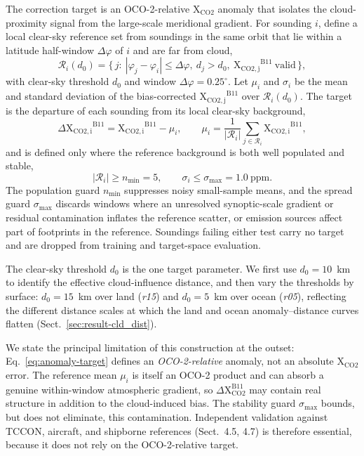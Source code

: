 The correction target is an OCO-2-relative $\mathrm{X_{CO2}}$ anomaly that isolates the cloud-proximity signal from the large-scale meridional  gradient. For sounding $i$, define a local clear-sky reference set from soundings in the same orbit that lie within a latitude half-window $\Delta\varphi$ of $i$ and are far from cloud,
%
\begin{equation}
  \mathcal{R}_i(d_0)
  = \bigl\{\, j :\ |\varphi_j - \varphi_i| \le \Delta\varphi,\
  d_j > d_0,\ \mathrm{X_{CO2,j}}^{\mathrm{B11}}\ \text{valid} \,\bigr\},
  \label{eq:reference-set}
\end{equation}
%
with clear-sky threshold $d_0$ and window $\Delta\varphi = 0.25^{\circ}$. Let
$\mu_i$ and $\sigma_i$ be the mean and standard deviation of the
bias-corrected $\mathrm{X_{CO2,j}}^{\mathrm{B11}}$ over $\mathcal{R}_i(d_0)$. The target is the departure of each sounding from its local clear-sky background,
%
\begin{equation}
  \Delta \mathrm{X_{CO2,i}}^{\mathrm{B11}}
  = \mathrm{X_{CO2,i}}^{\mathrm{B11}} - \mu_i,
  \qquad
  \mu_i = \frac{1}{|\mathcal{R}_i|}
  \sum_{j\in\mathcal{R}_i} \mathrm{X_{CO2,i}}^{\mathrm{B11}},
  \label{eq:anomaly-target}
\end{equation}
%
and is defined only where the reference background is both well populated and
stable,
%
\begin{equation}
  |\mathcal{R}_i| \ge n_{\min} = 5,
  \qquad
  \sigma_i \le \sigma_{\max} = 1.0\ \mathrm{ppm}.
  \label{eq:anomaly-guards}
\end{equation}
%
The population guard $n_{\min}$ suppresses noisy small-sample means, and the
spread guard $\sigma_{\max}$ discards windows where an unresolved
synoptic-scale gradient or residual contamination inflates the reference scatter, or emission sources affect part of footprints in the reference. Soundings failing either test carry no target and are dropped from
training and target-space evaluation.

The clear-sky threshold $d_0$ is the one target parameter. We first use $d_0 = 10$~km to identify the effective cloud-influence distance, and then vary the thresholds by surface: $d_0 = 15$~km over land
(\emph{r15}) and $d_0 = 5$~km over ocean (\emph{r05}), reflecting the different
distance scales at which the land and ocean anomaly--distance curves flatten
(Sect.~\ref{sec:result-cld_dist}). 

We state the principal limitation of this construction at the outset:
Eq.~\eqref{eq:anomaly-target} defines an \emph{OCO-2-relative} anomaly, not an
absolute $\mathrm{X_{CO2}}$ error. The reference mean $\mu_i$ is itself an OCO-2 product and can absorb a genuine within-window atmospheric gradient, so
$\Delta \mathrm{X_{CO2}^{B11}}$ may contain real \ce{CO2} structure in addition to the cloud-induced bias. The stability guard $\sigma_{\max}$ bounds, but does not eliminate, this contamination. Independent validation against TCCON, aircraft, and shipborne references (Sect.~4.5, 4.7) is therefore essential, because it does not rely on the OCO-2-relative target.
